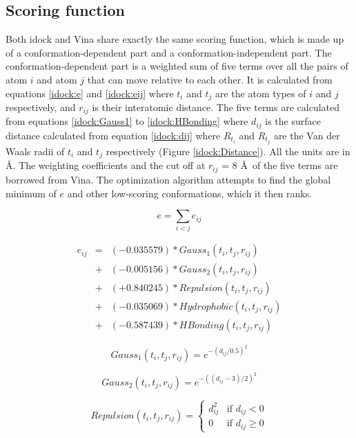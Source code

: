 \subsection{Scoring function}

Both idock and Vina share exactly the same scoring function, which is made up of a conformation-dependent part and a conformation-independent part. The conformation-dependent part is a weighted sum of five terms over all the pairs of atom $i$ and atom $j$ that can move relative to each other. It is calculated from equations \eqref{idock:e} and \eqref{idock:eij} where $t_i$ and $t_j$ are the atom types of $i$ and $j$ respectively, and $r_{ij}$ is their interatomic distance. The five terms are calculated from equations \eqref{idock:Gauss1} to \eqref{idock:HBonding} where $d_{ij}$ is the surface distance calculated from equation \eqref{idock:dij} where $R_{t_i}$ and $R_{t_j}$ are the Van der Waals radii of $t_i$ and $t_j$ respectively (Figure \ref{idock:Distance}). All the units are in \AA. The weighting coefficients and the cut off at $r_{ij}$ = 8 \AA\ of the five terms are borrowed from Vina. The optimization algorithm attempts to find the global minimum of $e$ and other low-scoring conformations, which it then ranks.

\begin{equation}
\label{idock:e}
e = \sum_{i < j} e_{ij}
\end{equation}

\begin{eqnarray}
\label{idock:eij}
e_{ij} &=& (-0.035579) * Gauss_1(t_i, t_j, r_{ij}) \nonumber \\
       &+& (-0.005156) * Gauss_2(t_i, t_j, r_{ij}) \nonumber \\
       &+& (+0.840245) * Repulsion(t_i, t_j, r_{ij}) \nonumber \\
       &+& (-0.035069) * Hydrophobic(t_i, t_j, r_{ij}) \nonumber \\
       &+& (-0.587439) * HBonding(t_i, t_j, r_{ij})
\end{eqnarray}

\begin{equation}
\label{idock:Gauss1}
Gauss_1(t_i, t_j, r_{ij}) = e^{-(d_{ij} / 0.5)^2}
\end{equation}

\begin{equation}
\label{idock:Gauss2}
Gauss_2(t_i, t_j, r_{ij}) = e^{-((d_{ij} - 3) / 2)^2}
\end{equation}

\begin{equation}
\label{idock:Repulsion}
Repulsion(t_i, t_j, r_{ij}) =
\begin{cases}
d_{ij}^2 & \text{if } d_{ij} < 0\\
0 &\text{if } d_{ij} \geq 0
\end{cases}
\end{equation}


